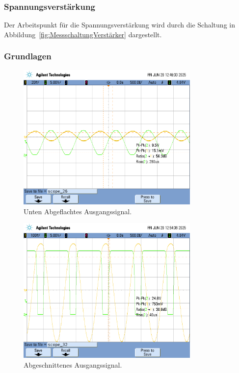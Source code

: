 \documentclass[
	a4paper, %
	12pt, %
]{CSUniSchoolLabReport}
\begin{document}
\subsubsection{Spannungsverstärkung}
Der Arbeitspunkt für die Spannungsverstärkung wird durch die Schaltung in Abbildung~\ref{fig:MessschaltungVerstärker} dargestellt.
\subsubsection{Grundlagen}

\begin{figure}[H]
	\centering
	\includegraphics[width=0.8\textwidth]{Figures/scope_26.png}
	\caption{Unten Abgeflachtes Ausgangssignal.}
	\label{fig:supplyrailsmid}
\end{figure}
\begin{figure}[H]
	\centering
	\includegraphics[width=0.8\textwidth]{Figures/supplyrailskrass.png}
	\caption{Abgeschnittenes Ausgangssignal.}
	\label{fig:supplyrailskrass}
\end{figure}
\end{document}
